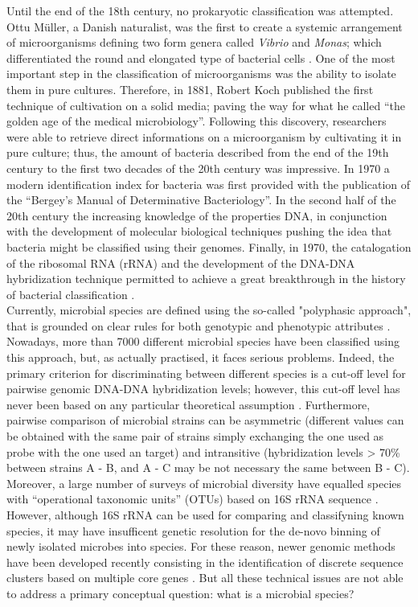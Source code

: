 Until the end of the 18th century, no prokaryotic classification was attempted. Ottu M\"{u}ller, a Danish naturalist, was the first to create a systemic arrangement of microorganisms defining two form genera called \textit{Vibrio} and \textit{Monas}; which differentiated the round and elongated type of bacterial cells \cite{logan2009bacterial}. One of the most important step in the classification of microorganisms was the ability to isolate them in pure cultures. Therefore, in 1881, Robert Koch published the first technique of cultivation on a solid media; paving the way for what he called ``the golden age of the medical microbiology''. Following this discovery, researchers were able to retrieve direct informations on a microorganism by cultivating it in pure culture; thus, the amount of bacteria described from the end of the 19th century to the first two decades of the 20th century was impressive. In 1970  a modern identification index for bacteria was first provided with the publication of the ``Bergey's Manual of Determinative Bacteriology''. In the second half of the 20th century the increasing knowledge of the properties DNA, in conjunction with the development of molecular biological techniques pushing the idea that bacteria might be classified using their genomes. Finally, in 1970, the catalogation of the ribosomal RNA (rRNA) and the development of the DNA-DNA hybridization technique permitted to achieve a great breakthrough in the history of bacterial classification \cite{stackebrandt198516, de1975improvements}.\\
Currently, microbial species are defined using the so-called "polyphasic approach", that is grounded on clear rules for both genotypic and phenotypic attributes \cite{vandamme1996polyphasic}. Nowadays, more than 7000 different microbial species have been classified using this approach, but, as actually practised, it faces serious problems. Indeed, the primary criterion for discriminating between different species is a cut-off level for pairwise genomic DNA-DNA hybridization levels; however, this cut-off level has never been based on any particular theoretical assumption \cite{de2005ernst, hey2006failure}. Furthermore, pairwise comparison of microbial strains can be asymmetric (different values can be obtained with the same pair of strains simply exchanging the one used as probe with the one used an target) and intransitive (hybridization levels > 70\% between strains A - B, and A - C may be not necessary the same between B - C). Moreover, a large number of surveys of microbial diversity have equalled species with ``operational taxonomic units'' (OTUs) based on 16S rRNA sequence \cite{ley2006microbial}. However, although 16S rRNA can be used for comparing and classifyning known species, it may have insufficent genetic resolution for the de-novo binning of newly isolated microbes into species. For these reason, newer genomic methods have been developed recently consisting in the identification of discrete sequence clusters based on multiple core genes \cite{fraser2007recombination, gevers2005re}. But all these technical issues are not able to address a primary conceptual question: what is a microbial species?\\

